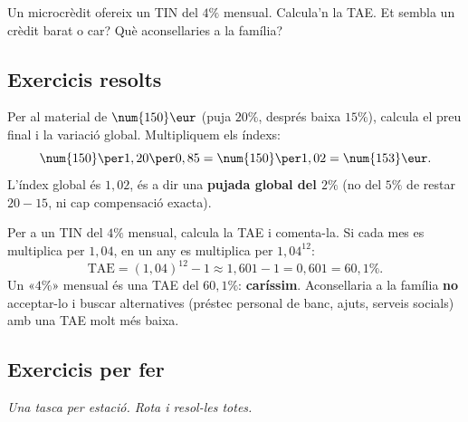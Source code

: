 \begin{exemple}
Un microcrèdit ofereix un TIN del $4\%$ mensual. Calcula'n la TAE. Et sembla un crèdit
barat o car? Què aconsellaries a la família?
\end{exemple}

\subsection{Exercicis resolts}

\begin{exresolt}
Per al material de $\num{150}\eur$ (puja $20\%$, després baixa $15\%$), calcula el preu
final i la variació global.
\solucio
Multipliquem els índexs:
\[
\num{150}\per 1,20\per 0,85=\num{150}\per 1,02=\num{153}\eur.
\]
L'índex global és $1,02$, és a dir una \textbf{pujada global del $2\%$} (no del $5\%$
de restar $20-15$, ni cap compensació exacta).
\end{exresolt}

\begin{exresolt}
Per a un TIN del $4\%$ mensual, calcula la TAE i comenta-la.
\solucio
Si cada mes es multiplica per $1,04$, en un any es multiplica per $1,04^{12}$:
\[
\text{TAE}=(1,04)^{12}-1\approx 1,601-1=0,601=60,1\%.
\]
Un «$4\%$» mensual és una TAE del $60,1\%$: \textbf{caríssim}. Aconsellaria a la
família \textbf{no} acceptar-lo i buscar alternatives (préstec personal de banc, ajuts,
serveis socials) amb una TAE molt més baixa.
\end{exresolt}

\subsection{Exercicis per fer}

\noindent\textit{Una tasca per estació. Rota i resol-les totes.}

